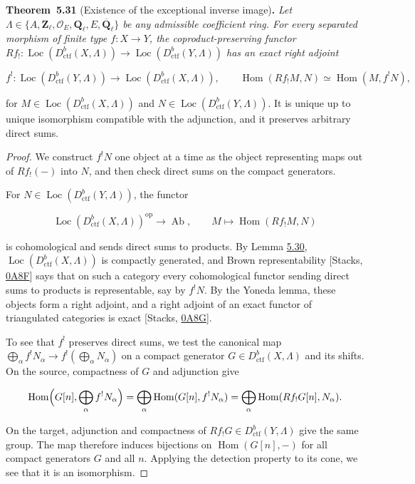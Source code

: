 \documentclass[11pt]{article}
\newenvironment{bpstatement}[2]{\par\addvspace{0.6\baselineskip}\noindent\textbf{#1}#2\textbf{.}\enspace\ignorespaces}
  {\par\addvspace{0.4\baselineskip}}
\newenvironment{bpstatementit}[2]{\begin{bpstatement}{#1}{#2}\itshape\ignorespaces}{\end{bpstatement}}
\providecommand{\Hom}{}\renewcommand{\Hom}{\operatorname{Hom}}
\providecommand{\Loc}{}\renewcommand{\Loc}{\operatorname{Loc}}
\begin{document}
\label{bp100}%
\begin{bpstatementit}{Theorem~5.31}{ (Existence of the exceptional inverse image)}
Let \(\Lambda\in\{A,\mathbf Z_\ell,\mathcal O_E,\mathbf Q_\ell,E,\overline{\mathbf Q}_\ell\}\) be any admissible coefficient ring. For every separated morphism of finite type \(f:X\to Y\), the coproduct-preserving functor \(Rf_!:\Loc(D^b_{\mathrm{ctf}}(X,\Lambda))\to\Loc(D^b_{\mathrm{ctf}}(Y,\Lambda))\) has an exact right adjoint

\[
f^!:\Loc(D^b_{\mathrm{ctf}}(Y,\Lambda))\longrightarrow\Loc(D^b_{\mathrm{ctf}}(X,\Lambda)),
\qquad
\Hom(Rf_!M,N)\simeq\Hom(M,f^!N),
\]

for \(M\in\Loc(D^b_{\mathrm{ctf}}(X,\Lambda))\) and \(N\in\Loc(D^b_{\mathrm{ctf}}(Y,\Lambda))\). It is unique up to unique isomorphism compatible with the adjunction, and it preserves arbitrary direct sums.
\end{bpstatementit}

\begin{proof}[{Proof}]\label{bp101}%
We construct \(f^!N\) one object at a time as the object representing maps out of \(Rf_!(-)\) into \(N\), and then check direct sums on the compact generators.

For \(N\in\Loc(D^b_{\mathrm{ctf}}(Y,\Lambda))\), the functor

\[
\Loc(D^b_{\mathrm{ctf}}(X,\Lambda))^{\mathrm{op}}\longrightarrow\operatorname{Ab},
\qquad M\longmapsto\Hom(Rf_!M,N)
\]

is cohomological and sends direct sums to products. By Lemma \hyperref[bp97]{5.30}, \(\Loc(D^b_{\mathrm{ctf}}(X,\Lambda))\) is compactly generated, and Brown representability [Stacks, \href{https://stacks.math.columbia.edu/tag/0A8F}{0A8F}] says that on such a category every cohomological functor sending direct sums to products is representable, say by \(f^!N\). By the Yoneda lemma, these objects form a right adjoint, and a right adjoint of an exact functor of triangulated categories is exact [Stacks, \href{https://stacks.math.columbia.edu/tag/0A8G}{0A8G}].

To see that \(f^!\) preserves direct sums, we test the canonical map \(\bigoplus_\alpha f^!N_\alpha\to f^!(\bigoplus_\alpha N_\alpha)\) on a compact generator \(G\in D^b_{\mathrm{ctf}}(X,\Lambda)\) and its shifts. On the source, compactness of \(G\) and adjunction give

\[
\Hom\Bigl(G[n],\bigoplus_\alpha f^!N_\alpha\Bigr)
=\bigoplus_\alpha\Hom(G[n],f^!N_\alpha)
=\bigoplus_\alpha\Hom(Rf_!G[n],N_\alpha).
\]

On the target, adjunction and compactness of \(Rf_!G\in D^b_{\mathrm{ctf}}(Y,\Lambda)\) give the same group. The map therefore induces bijections on \(\Hom(G[n],-)\) for all compact generators \(G\) and all \(n\). Applying the detection property to its cone, we see that it is an isomorphism.
\end{proof}
\end{document}
